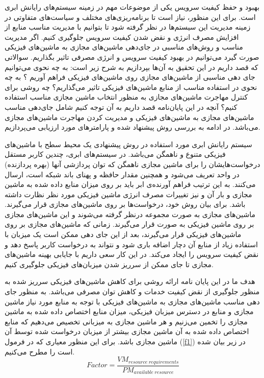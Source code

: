  بهبود و حفظ کیفیت سرویس یکی از موضوعات مهم در زمینه سیستم‌های رایانش ابری است. برای این منظور، نیاز است تا برنامه‌ریزی‌های مختلف و سیاست‌های متفاوتی در زمینه مدیریت این سیستم‌ها در نظر گرفته شود تا بتوانیم با مدیریت مناسب منابع از افزایش مصرف انرژی  و نقض شدن کیفیت سرویس جلوگیری کنیم. اگر مدیریت مناسب و روش‌های مناسبی در جای‌دهی ماشین‌های مجازی به ماشین‌های فیزیکی صورت گیرد می‌توانیم در بهبود کیفیت سرویس و انرژی مصرفی تاثیر بگذاریم. سوالاتی که قصد داریم  در این تحقیق به آن‌ها بپردازیم به شرح زیر است:
 به چه نحوی می‌توانیم جای دهی مناسبی از ماشین‌های مجازی روی ماشین‌های فیزیکی فراهم آوریم ؟
 به چه نحوی در استفاده مناسب از منابع ماشین‌های فیزیکی تاثیر می‌گذاریم؟
 چه روشی برای کنترل مهاجرت ماشین‌های مجازی به منظور انتخاب ماشین مجازی مناسب استفاده کنیم؟
آنچه در این پایان‌نامه قصد داریم به آن توجه کنیم شامل جای‌دهی مناسب ماشین‌های مجازی به ماشین‌های فیزیکی و مدیریت کردن مهاجرت ماشین‌های مجازی می‌باشد. 
در ادامه به بررسی روش پیشنهاد شده و پارامتر‌های مورد ارزیابی می‌پردازیم.

سیستم رایانش ابری مورد استفاده در روش پیشنهادی یک محیط سطح
 با ماشین‌های فیزیکی متنوع و ناهمگن می‌باشد. در سیستم‌های ابری، چندین کاربر مستقل درخواست‌هایشان را برای
  ماشین مجازی ناهمگن که توان پردازشی آنها (بهره پردازنده) در واحد
    تعریف می‌شود و همچنین مقدار حافظه و پهنای باند شبکه است، ارسال می‌کنند. به این ترتیب فراهم آورنده‌ی ابر باید بر روی میزان منابع داده شده به ماشین مجازی و بار آن و نیز تغییرات مصرف انرژی ماشین فیزیکی مورد نظر نظارت داشته باشد. 
برای بیان روش خود، درخواست‌ها بر روی ماشین‌های مجازی قرار می‌گیرند. ماشین‌های مجازی به صورت مجموعه
 درنظر گرفته می‌شوند و این ماشین‌های مجازی بر روی 
 ماشین فیزیکی به صورت 
  قرار می‌گیرند. زمانی که ماشین‌های مجازی بر روی ماشین‌های فیزیکی قرار می‌گیرند، بعد از این جای دهی ممکن است یک میزبان با استفاده زیاد از منابع آن دچار اضافه باری شود و نتواند به درخواست کاربر پاسخ دهد و نقض کیفیت سرویس را ایجاد می‌کند. در این کار سعی داریم با جایابی بهینه ماشین‌های مجازی تا جای ممکن از سرریز شدن میزبان‌های فیزیکی جلوگیری کنیم.
  
هدف ما در این پایان نامه ارائه روشی برای کاهش ماشین‌های فیزیکی سرریز شده به منظور جلوگیری از نقض کیفیت خدمات و کاهش توان مصرفی می‌باشد. به منظور جای دهی مناسب ماشین‌های مجازی به ماشین‌های فیزیکی با توجه به منابع مورد نیاز ماشین مجازی و منابع در دسترس میزبان فیزیکی، میزان منابع اختصاص داده شده به ماشین مجازی را تخمین می‌زنیم و هر ماشین مجازی به میزبانی تخصیص می‌دهیم که منابع اختصاص داده شده به آن ماشین مجازی بیشتر از میزبان درخواست شده توسط آن ماشین مجازی باشد. برای این منظور معیاری که در فرمول
(\ref{f1})
 در زیر بیان شده است را مطرح می‌کنیم.
 \begin{equation}
Factor= \frac{VM_{resource\hspace{3pt} requirements}}{PM_{available\hspace{3pt} resource}}
\label{f1}
 \end{equation}
                                                                                


